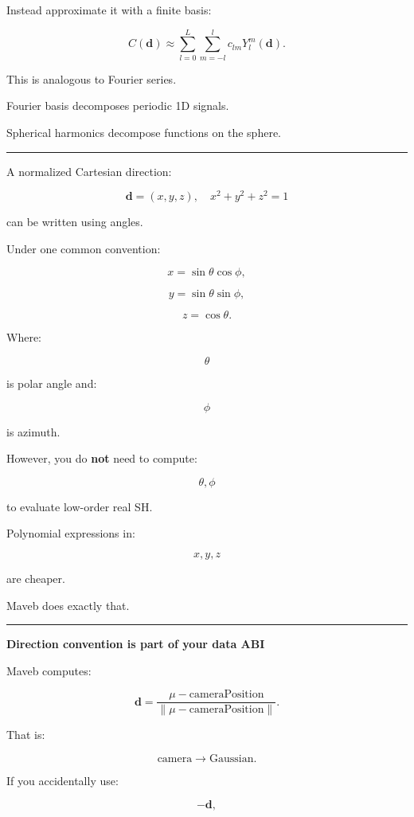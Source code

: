 Instead approximate it with a finite basis:

\[
C(\mathbf d)
\approx
\sum_{l=0}^{L}
\sum_{m=-l}^{l}
c_{lm}
Y_l^m(\mathbf d).
\]

This is analogous to Fourier series.

Fourier basis decomposes periodic 1D signals.

Spherical harmonics decompose functions on the sphere.

\begin{center}\rule{0.5\linewidth}{0.5pt}\end{center}

A normalized Cartesian direction:

\[
\mathbf d=
(x,y,z),
\quad
x^2+y^2+z^2=1
\]

can be written using angles.

Under one common convention:

\[
x=\sin\theta\cos\phi,
\]

\[
y=\sin\theta\sin\phi,
\]

\[
z=\cos\theta.
\]

Where:

\[
\theta
\]

is polar angle and:

\[
\phi
\]

is azimuth.

However, you do \textbf{not} need to compute:

\[
\theta,\phi
\]

to evaluate low-order real SH.

Polynomial expressions in:

\[
x,y,z
\]

are cheaper.

Maveb does exactly that.

\begin{center}\rule{0.5\linewidth}{0.5pt}\end{center}

\textbf{Direction convention is part of your data ABI}

Maveb computes:

\[
\mathbf d
=
\frac{
\mu-\text{cameraPosition}
}{
\|\mu-\text{cameraPosition}\|
}.
\]

That is:

\[
\boxed{
\text{camera}\rightarrow\text{Gaussian}.
}
\]

If you accidentally use:

\[
-\mathbf d,
\]

